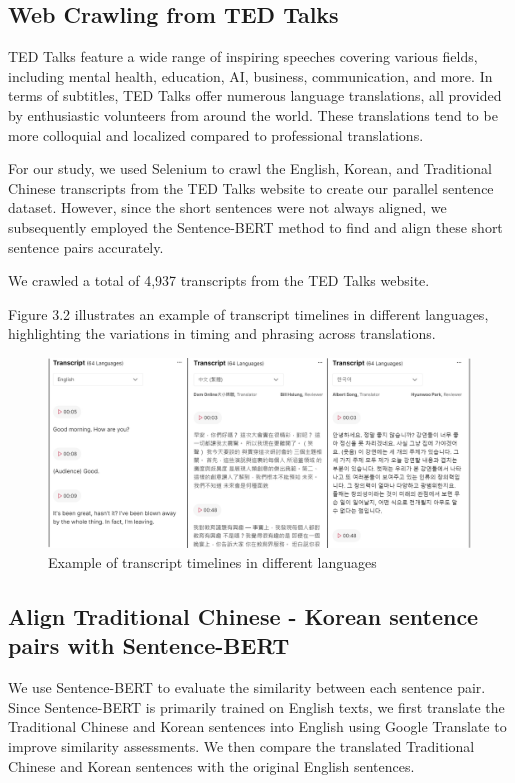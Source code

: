 \documentclass[PhD]{PHlab-thesis}
\begin{document}
\subsection{Web Crawling from TED Talks}
TED Talks feature a wide range of inspiring speeches covering various fields, including mental health, education, AI, business, communication, and more. In terms of subtitles, TED Talks offer numerous language translations, all provided by enthusiastic volunteers from around the world. These translations tend to be more colloquial and localized compared to professional translations.

For our study, we used Selenium to crawl the English, Korean, and Traditional Chinese transcripts from the TED Talks website to create our parallel sentence dataset. However, since the short sentences were not always aligned, we subsequently employed the Sentence-BERT method to find and align these short sentence pairs accurately.

We crawled a total of 4,937 transcripts from the TED Talks website.

Figure 3.2 illustrates an example of transcript timelines in different languages, highlighting the variations in timing and phrasing across translations.

\begin{figure}[h!]
  \centering
  \includegraphics[width=\linewidth]{fig_3_2.jpg}
  \captionsetup{type=figure}
  \caption{Example of transcript timelines in different languages}
  \label{fig:transcript}
\end{figure}

\subsection{Align Traditional Chinese - Korean sentence pairs with Sentence-BERT}
We use Sentence-BERT to evaluate the similarity between each sentence pair. Since Sentence-BERT is primarily trained on English texts, we first translate the Traditional Chinese and Korean sentences into English using Google Translate to improve similarity assessments. We then compare the translated Traditional Chinese and Korean sentences with the original English sentences.
\end{document}
